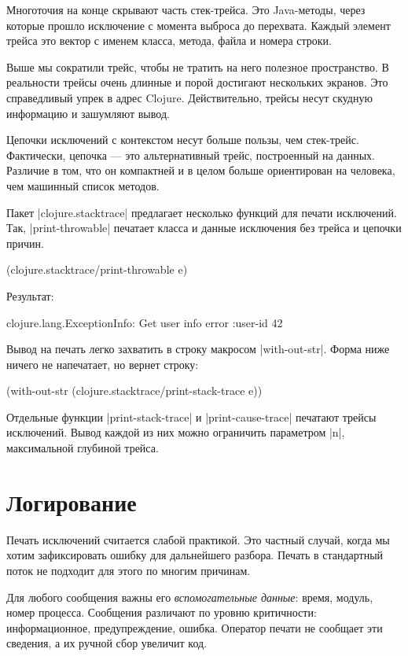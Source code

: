 Многоточия на конце скрывают часть стек-трейса. Это Java-методы, через которые
прошло исключение с момента выброса до перехвата. Каждый элемент трейса это
вектор с именем класса, метода, файла и номера строки.

Выше мы сократили трейс, чтобы не тратить на него полезное пространство. В
реальности трейсы очень длинные и порой достигают нескольких экранов. Это
справедливый упрек в адрес Clojure. Действительно, трейсы несут скудную
информацию и зашумляют вывод.

Цепочки исключений с контекстом несут больше пользы, чем стек-трейс. Фактически,
цепочка — это альтернативный трейс, построенный на данных. Различие в том, что
он компактней и в целом больше ориентирован на человека, чем машинный список
методов.

Пакет \spverb|clojure.stacktrace| предлагает несколько функций для печати
исключений. Так, \spverb|print-throwable| печатает класса и данные исключения без
трейса и цепочки причин.

\begin{code}
(clojure.stacktrace/print-throwable e)
\end{code}

Результат:

\begin{code}
clojure.lang.ExceptionInfo: Get user info error
{:user-id 42}
\end{code}

Вывод на печать легко захватить в строку макросом \spverb|with-out-str|. Форма ниже
ничего не напечатает, но вернет строку:

\begin{code}
(with-out-str
  (clojure.stacktrace/print-stack-trace e))
\end{code}

Отдельные функции \spverb|print-stack-trace| и \spverb|print-cause-trace| печатают трейсы
исключений. Вывод каждой из них можно ограничить параметром \spverb|n|, максимальной
глубиной трейса.

\section{Логирование}

Печать исключений считается слабой практикой. Это частный случай, когда мы хотим
зафиксировать ошибку для дальнейшего разбора. Печать в стандартный поток не
подходит для этого по многим причинам.

Для любого сообщения важны его \emph{вспомогательные данные}: время, модуль, номер
процесса. Сообщения различают по уровню критичности: информационное,
предупреждение, ошибка. Оператор печати не сообщает эти сведения, а их ручной
сбор увеличит код.

